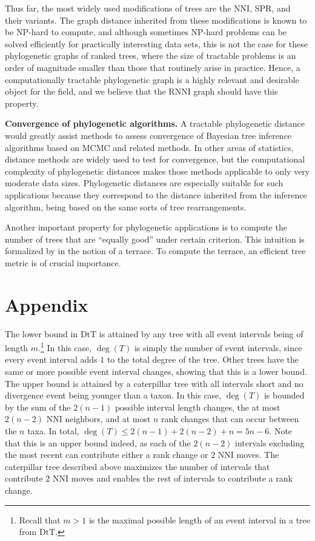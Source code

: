 \documentclass[11pt]{amsart}
\theoremstyle{definition}
\newcommand{\nni}{\mathrm{NNI}}
\newcommand{\rnni}{\mathrm{RNNI}}
\newcommand{\dtt}{\mathrm{DtT}}
\begin{document}
Thus far, the most widely used modifications of trees are the $\nni$, SPR, and their variants.
The graph distance inherited from these modifications is known to be NP-hard to compute, and although sometimes NP-hard problems can be solved efficiently for practically interesting data sets, this is not the case for these phylogenetic graphs of ranked trees, where the size of tractable problems is an order of magnitude smaller than those that routinely arise in practice.
Hence, a computationally tractable phylogenetic graph is a highly relevant and desirable object for the field, and we believe that the $\rnni$ graph should have this property.

\textbf{Convergence of phylogenetic algorithms.} A tractable phylogenetic distance would greatly assist methods to assess convergence of Bayesian tree inference algorithms based on MCMC and related methods.
In other areas of statistics, distance methods are widely used to test for convergence, but the computational complexity of phylogenetic distances makes those methods applicable to only very moderate data sizes.
Phylogenetic distances are especially suitable for such applications because they correspond to the distance inherited from the inference algorithm, being based on the same sorts of tree rearrangements.

Another important property for phylogenetic applications is to compute the number of trees that are ``equally good'' under certain criterion.
This intuition is formalized by \textcite{Sanderson2011-zp} in the notion of a terrace.
To compute the terrace, an efficient tree metric is of crucial importance.

\newpage


\section{Appendix}
\label{secAppendix}

The lower bound in $\dtt$ is attained by any tree with all event intervals being of length $m$.\footnote{
Recall that $m > 1$ is the maximal possible length of an event interval in a tree from $\dtt$.}
In this case, $\deg(T)$ is simply the number of event intervals, since every event interval adds $1$ to the total degree of the tree.
Other trees have the same or more possible event interval changes, showing that this is a lower bound.
The upper bound is attained by a caterpillar tree with all intervals short and no divergence event being younger than a taxon.
In this case, $\deg(T)$ is bounded by the sum of the $2(n-1)$ possible interval length changes, the at most $2(n-2)$ $\nni$ neighbors, and at most $n$ rank changes that can occur between the $n$ taxa.
In total, $\deg(T) \le 2(n-1) + 2(n-2) + n = 5n-6$.
Note that this is an upper bound indeed, as each of the $2(n-2)$ intervals excluding the most recent can contribute either a rank change or $2$ $\nni$ moves.
The caterpillar tree described above maximizes the number of intervals that contribute $2$ $\nni$ moves and enables the rest of intervals to contribute a rank change.
\end{document}
